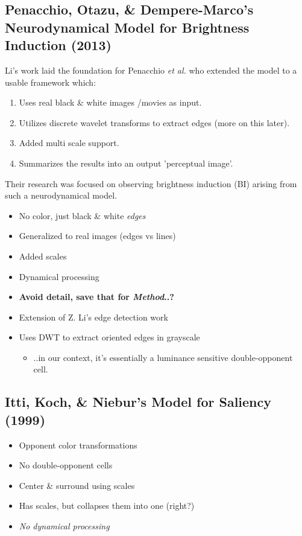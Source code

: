 \documentclass[journal,onecolumn]{IEEEtran}
\begin{document}
\subsection*{Penacchio, Otazu, \& Dempere-Marco's Neurodynamical Model for Brightness Induction (2013)}

Li's work laid the foundation for Penacchio \textit{et al.} who extended the model to a usable framework which:
\begin{enumerate}
    \item Uses real black \& white images /movies as input.
    \item Utilizes discrete wavelet transforms to extract edges (more on this later).
    \item Added multi scale support.
    \item Summarizes the results into an output 'perceptual image'.
\end{enumerate}
Their research was focused on observing brightness induction (BI) arising from such a neurodynamical model.
\begin{itemize}
    \item No color, just black \& white \textit{edges}
    \item Generalized to real images (edges vs lines)
    \item Added scales
    \item Dynamical processing
    \item \textbf{Avoid detail, save that for \textit{Method}..?}
    \item Extension of Z. Li's edge detection work
    \item Uses DWT to extract oriented edges in grayscale
    \begin{itemize}
        \item ..in our context, it's essentially a luminance sensitive double-opponent cell.
    \end{itemize}
\end{itemize}


\subsection*{Itti, Koch, \& Niebur's Model for Saliency (1999)}
\begin{itemize}
    \item Opponent color transformations
    \item No double-opponent cells
    \item Center \& surround using scales
    \item Has scales, but collapses them into one (right?)
    \item \textit{No dynamical processing}
\end{itemize}
\end{document}
